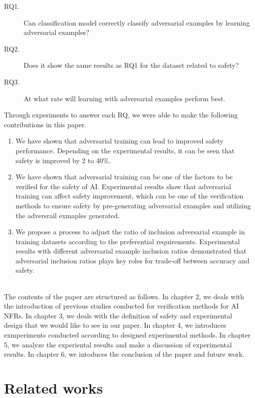 \documentclass[journal,article,submit,moreauthors,pdftex]{Definitions/mdpi}
\begin{document}
\begin{description}
    \item[RQ1.]	Can classification model correctly classify adversarial examples by learning adversarial examples?
    \item[RQ2.]	Does it show the same results as RQ1 for the dataset related to safety?
    \item[RQ3.]	At what rate will learning with adversarial examples perform best.
\end{description}

Through experiments to answer each RQ, we were able to make the following contributions in this paper. \\

\begin{enumerate}
    \item	We have shown that adversarial training can lead to improved safety performance. Depending on the experimental results, it can be seen that safety is improved by 2 to 40\%.
    \item	 We have shown that adversarial training can be one of the factors to be verified for the safety of AI. Experimental results show that adversarial training can affect safety improvement, which can be one of the verification methods to ensure safety by pre-generating adversarial examples and utilizing the adversrail exmaples generated.
    \item	We propose a process to adjust the ratio of inclusion adversarial example in training datasets according to the preferential requirements. Experimental results with different adversarial example inclusion ratios demonstrated that adversarial inclusion ratios plays key roles for trade-off between accuracy and safety.
\end{enumerate} \\

The contents of the paper are structured as follows. In chapter 2, we deals with the introduction of previous studies conducted for verification methods for AI NFRs.
In chapter 3, we deals with the definition of safety and experimental design that we would like to see in our paper.
In chapter 4, we introduces exmperiments conducted according to designed experimental methods.
In chapter 5, we analyze the experiental results and make a discussion of experimental results.
In chapter 6, we intoduces the conclusion of the paper and future work.

\section{Related works}
\end{document}
